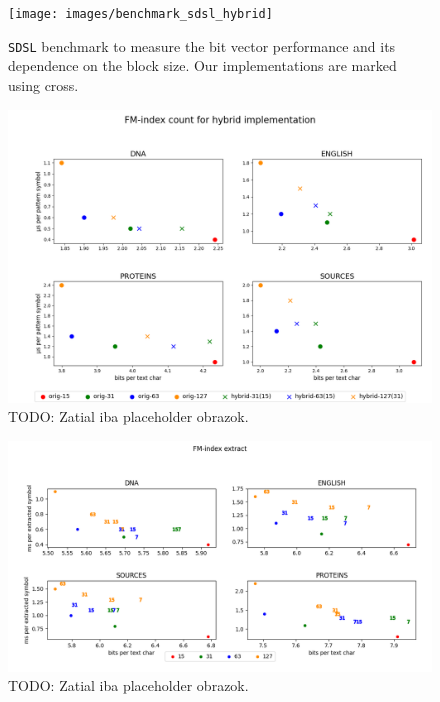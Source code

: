 \begin{figure}
	\centerline{
		\texttt{[image: images/benchmark\_sdsl\_hybrid]}
	}
	\caption[TODO]{\texttt{SDSL} benchmark to measure the bit vector performance and its dependence
	on the block size. Our implementations are marked using cross.
	}
	\label{obr:benchmark_sdsl_hybrid}
\end{figure}

\begin{figure}
	\centerline{
		\includegraphics[width=\textwidth, height=0.4\textheight]{images/vysledky_sdsl_hybrid_count}
	}
	\caption[TODO]{TODO: Zatial iba placeholder obrazok.
	}
	\label{obr:benchmark_sdsl_hybrid_count}
\end{figure}

\begin{figure}
	\centerline{
		\includegraphics[width=\textwidth, height=0.4\textheight]{images/vysledky_sdsl_hybrid_extract}
	}
	\caption[TODO]{TODO: Zatial iba placeholder obrazok.
	}
	\label{obr:benchmark_sdsl_hybrid_extract}
\end{figure}

